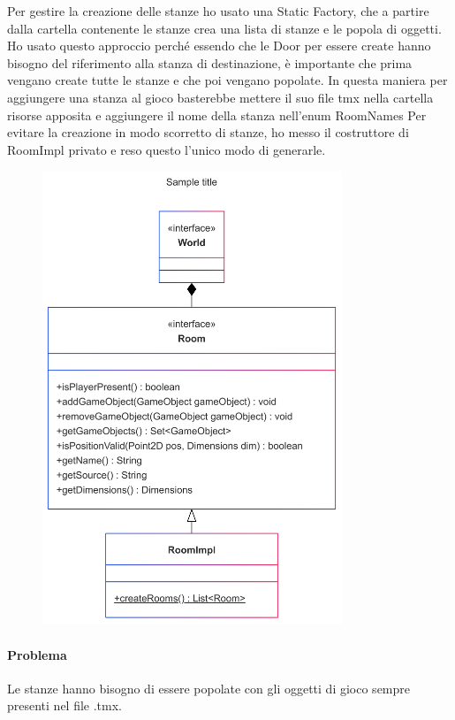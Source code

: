 \documentclass[a4paper,12pt]{report}
\begin{document}
Per gestire la creazione delle stanze ho usato una Static Factory, che a partire dalla cartella contenente le stanze crea una lista di stanze e le popola di oggetti.
Ho usato questo approccio perché essendo che le Door per essere create hanno bisogno del riferimento alla stanza di destinazione, è importante che prima vengano create tutte le stanze e che poi vengano popolate.
In questa maniera per aggiungere una stanza al gioco basterebbe mettere il suo file tmx nella cartella risorse apposita e aggiungere il nome della stanza nell'enum RoomNames
Per evitare la creazione in modo scorretto di stanze, ho messo il costruttore di RoomImpl privato e reso questo l'unico modo di generarle.
\begin{figure}[h]
    \centering
    \includegraphics[width=0.8\textwidth]{img/Room.png}
    \label{img:ObjectExtractor}
\end{figure}

\paragraph{Problema} %
Le stanze hanno bisogno di essere popolate con gli oggetti di gioco sempre presenti nel file .tmx.
\end{document}
